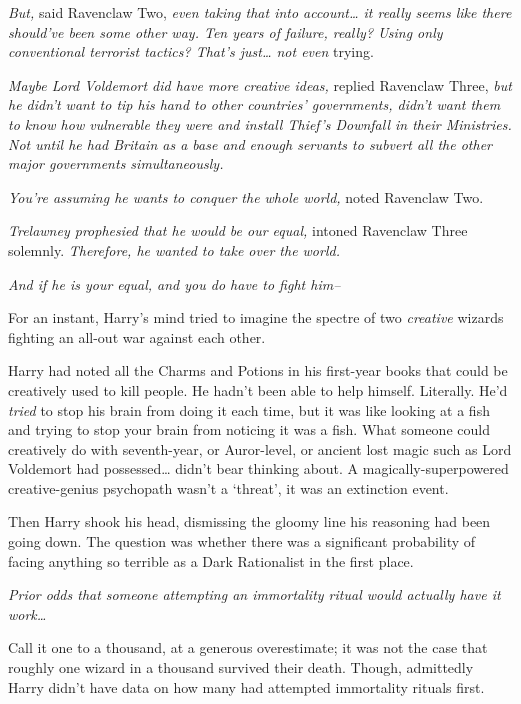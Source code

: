 \emph{But,} said Ravenclaw Two, \emph{even taking that into account{\ldots} it really seems like there should've been \emph{some} other way. Ten years of failure, really? Using only conventional terrorist tactics? That's just{\ldots} not even} trying.

\emph{Maybe Lord Voldemort did have more creative ideas,} replied Ravenclaw Three, \emph{but he didn't want to tip his hand to \emph{other} countries' governments, didn't want \emph{them} to know how vulnerable they were and install Thief's Downfall in \emph{their} Ministries. Not until he had Britain as a base and enough servants to subvert \emph{all} the other major governments simultaneously.}

\emph{You're assuming he wants to conquer the whole world,} noted Ravenclaw Two.

\emph{Trelawney prophesied that he would be our equal,} intoned Ravenclaw Three solemnly. \emph{Therefore, he wanted to take over the world.}

\emph{And if he is your equal, and you do have to fight him\---}

For an instant, Harry's mind tried to imagine the spectre of two \emph{creative} wizards fighting an all-out war against each other.

Harry had noted all the Charms and Potions in his first-year books that could be creatively used to kill people. He hadn't been able to help himself. Literally. He'd \emph{tried} to stop his brain from doing it each time, but it was like looking at a fish and trying to stop your brain from noticing it was a fish. What someone could creatively do with seventh-year, or Auror-level, or ancient lost magic such as Lord Voldemort had possessed{\ldots} didn't bear thinking about. A magically-superpowered creative-genius psychopath wasn't a `threat', it was an extinction event.

Then Harry shook his head, dismissing the gloomy line his reasoning had been going down. The question was whether there was a significant probability of facing anything so terrible as a Dark Rationalist in the first place.

\emph{Prior odds that someone attempting an immortality ritual would actually have it work{\ldots}}

Call it one to a thousand, at a generous overestimate; it was not the case that roughly one wizard in a thousand survived their death. Though, admittedly Harry didn't have data on how many had attempted immortality rituals first.

